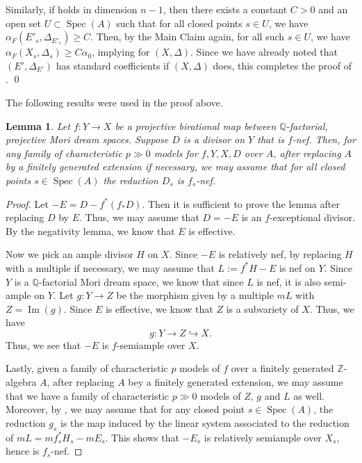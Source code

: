 \documentclass[11pt,reqno]{amsart}
\newcommand{\Q}{\mathbb{Q}}
\newcommand{\Z}{\mathbb{Z}}
\DeclareMathOperator{\Spec}{Spec}
\DeclareMathOperator{\im}{Im}
\numberwithin{equation}{section}
\newtheorem{lem}[prop] {Lemma}
\theoremstyle{definition}
\newcommand{\FA}{\alpha_{F}}
\begin{document}
Similarly, if  holds in dimension $n -1$, then there exists a constant $C >0 $ and an open set $U \subset \Spec(A)$ such that for all closed points $s \in U$, we have $\FA (E' _s, \Delta_{E'_s}) \geq C$. Then, by the Main Claim  again, for all such $s \in U$, we have $\FA(X_s, \Delta_s) \geq C \alpha_0$, implying  for $(X, \Delta)$. Since we have already noted that $(E' , \Delta_{E'})$ has standard coefficients if $(X, \Delta)$ does, 
this completes the proof of . \qed

The following results were used in the proof above.

\begin{lem} \label{lemmareductionofnef}
    Let  $f: Y \to X$ be a projective birational map between $\Q$-factorial, projective Mori dream spaces. Suppose $D$ is a divisor on $Y$ that is $f$-nef. Then, for any family of characteristic $p \gg 0$ models for $f, Y, X, D$ over $A$, after replacing $A$ by a finitely generated extension if necessary, we may assume that for all closed points $s \in \Spec(A)$ the reduction $D_s$ is $f_s$-nef.
\end{lem}

\begin{proof}
Let $-E = D - f^* (f_*D)$. Then it is sufficient to prove the lemma after replacing $D$ by $E$. Thus, we may assume that $D = -E$ is an $f$-exceptional divisor. By the negativity lemma, we know that $E$ is effective.

Now we pick an ample divisor $H$ on $X$. Since $-E$ is relatively nef, by replacing $H$ with a multiple if necessary, we may assume that $L := f^* H - E$ is nef on $Y$. Since $Y$ is a $\Q$-factorial Mori dream space, we know that since $L$ is nef, it is also semi-ample on $Y$. Let $g : Y \to Z$ be the morphism given by a multiple $mL$ with $ Z = \im (g)$. Since $E$ is effective, we know that $Z$ is a subvariety of $X$. Thus, we have
\[ g: Y \to Z \hookrightarrow X. \]
Thus, we see that $-E$ is $f$-semiample over $X$.

Lastly, given a family of characteristic $p$ models of $f$ over a finitely generated $\Z$-algebra $A$, after replacing $A$ bey a finitely generated extension, we may assume that we have a family of characteristic $p \gg 0$ models of $Z$, $g$ and $L$ as well. Moreover, by \cite[Lemma~2.22]{GongyoOkawaSannaiTakagiCoxRings}, we may assume that for any closed point $s \in \Spec(A)$, the reduction $g_s$ is the map induced by the linear system associated to the reduction of $mL = mf_s ^* H_s - m E_s$. This shows that $-E_s$ is relatively semiample over $X_s$, hence is $f_s$-nef. 
\end{proof}
\end{document}
